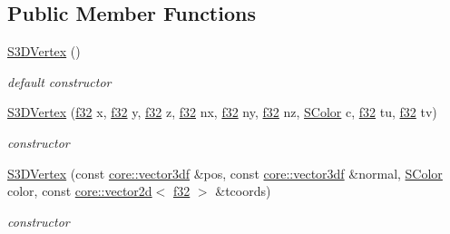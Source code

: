 \subsection*{Public Member Functions}
\begin{DoxyCompactItemize}
\item 
\mbox{\label{structirr_1_1video_1_1S3DVertex_a396baea2fe79be060fe7bd50bed81c6e}} 
\hyperlink{structirr_1_1video_1_1S3DVertex_a396baea2fe79be060fe7bd50bed81c6e}{S3\+D\+Vertex} ()
\begin{DoxyCompactList}\small\item\em default constructor \end{DoxyCompactList}\item 
\mbox{\label{structirr_1_1video_1_1S3DVertex_a90158074178ec2c180bafb47c04a763a}} 
\hyperlink{structirr_1_1video_1_1S3DVertex_a90158074178ec2c180bafb47c04a763a}{S3\+D\+Vertex} (\hyperlink{namespaceirr_a0277be98d67dc26ff93b1a6a1d086b07}{f32} x, \hyperlink{namespaceirr_a0277be98d67dc26ff93b1a6a1d086b07}{f32} y, \hyperlink{namespaceirr_a0277be98d67dc26ff93b1a6a1d086b07}{f32} z, \hyperlink{namespaceirr_a0277be98d67dc26ff93b1a6a1d086b07}{f32} nx, \hyperlink{namespaceirr_a0277be98d67dc26ff93b1a6a1d086b07}{f32} ny, \hyperlink{namespaceirr_a0277be98d67dc26ff93b1a6a1d086b07}{f32} nz, \hyperlink{classirr_1_1video_1_1SColor}{S\+Color} c, \hyperlink{namespaceirr_a0277be98d67dc26ff93b1a6a1d086b07}{f32} tu, \hyperlink{namespaceirr_a0277be98d67dc26ff93b1a6a1d086b07}{f32} tv)
\begin{DoxyCompactList}\small\item\em constructor \end{DoxyCompactList}\item 
\mbox{\label{structirr_1_1video_1_1S3DVertex_a4af08bc1db2d4dbac1c6e9f8fe1c01d0}} 
\hyperlink{structirr_1_1video_1_1S3DVertex_a4af08bc1db2d4dbac1c6e9f8fe1c01d0}{S3\+D\+Vertex} (const \hyperlink{namespaceirr_1_1core_ae6e2b2a6c552833ebbd5b7463d03586b}{core\+::vector3df} \&pos, const \hyperlink{namespaceirr_1_1core_ae6e2b2a6c552833ebbd5b7463d03586b}{core\+::vector3df} \&normal, \hyperlink{classirr_1_1video_1_1SColor}{S\+Color} color, const \hyperlink{classirr_1_1core_1_1vector2d}{core\+::vector2d}$<$ \hyperlink{namespaceirr_a0277be98d67dc26ff93b1a6a1d086b07}{f32} $>$ \&tcoords)
\begin{DoxyCompactList}\small\item\em constructor \end{DoxyCompactList}\item 

\end{DoxyCompactItemize}
